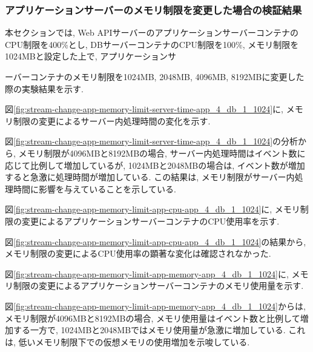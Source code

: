 \documentclass[../../../../main]{subfiles}
\begin{document}
    \subsubsection{アプリケーションサーバーのメモリ制限を変更した場合の検証結果}\label{subsubsec:result-streaming-change-app-memory}

    本セクションでは, Web APIサーバーのアプリケーションサーバーコンテナのCPU制限を400\%とし, DBサーバーコンテナのCPU制限を100\%, メモリ制限を1024MBと設定した上で, アプリケーションサ

    ーバーコンテナのメモリ制限を1024MB, 2048MB, 4096MB, 8192MBに変更した際の実験結果を示す.


    図\ref{fig:stream-change-app-memory-limit-server-time-app_4_db_1_1024}に, メモリ制限の変更によるサーバー内処理時間の変化を示す.

    

    図\ref{fig:stream-change-app-memory-limit-server-time-app_4_db_1_1024}の分析から, メモリ制限が4096MBと8192MBの場合, サーバー内処理時間はイベント数に応じて比例して増加しているが, 1024MBと2048MBの場合は, イベント数が増加すると急激に処理時間が増加している. この結果は, メモリ制限がサーバー内処理時間に影響を与えていることを示している.


    図\ref{fig:stream-change-app-memory-limit-app-cpu-app_4_db_1_1024}に, メモリ制限の変更によるアプリケーションサーバーコンテナのCPU使用率を示す.

    

    図\ref{fig:stream-change-app-memory-limit-app-cpu-app_4_db_1_1024}の結果から, メモリ制限の変更によるCPU使用率の顕著な変化は確認されなかった.


    図\ref{fig:stream-change-app-memory-limit-app-memory-app_4_db_1_1024}に, メモリ制限の変更によるアプリケーションサーバーコンテナのメモリ使用量を示す.

    

    図\ref{fig:stream-change-app-memory-limit-app-memory-app_4_db_1_1024}からは, メモリ制限が4096MBと8192MBの場合, メモリ使用量はイベント数と比例して増加する一方で, 1024MBと2048MBではメモリ使用量が急激に増加している. これは, 低いメモリ制限下での仮想メモリの使用増加を示唆している.
\end{document}
